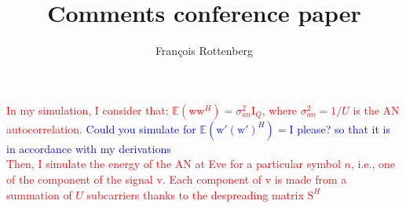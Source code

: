 \documentclass[12pt]{article}
\newcommand{\vect}[1]{\boldsymbol{\mathrm{#1}}}
\newcommand{\mat}[1]{\boldsymbol{\mathrm{#1}}}
\begin{document}
\title{Comments conference paper}
\author{Fran\c cois Rottenberg}
\maketitle
\large
\textcolor{red}{In my simulation, I consider that: $\mathbb{E}\left(\vect{w}\vect{w}^H\right) = \sigma^2_{an} \mat{I}_Q$, where $\sigma^2_{an} = 1/U$ is the AN autocorrelation.  \textcolor{blue}{Could you simulate for $\mathbb{E}\left({\vect{w}}'({\vect{w}}')^H\right)=\mat{I}$ please? so that it is in accordance with my derivations}\\
Then, I simulate the energy of the AN at Eve for a particular symbol $n$, i.e., one of the component of the signal $\vect{v}$. Each component of $\vect{v}$ is made from a summation of $U$ subcarriers thanks to the despreading matrix $\mat{S}^H$}\\
\end{document}
